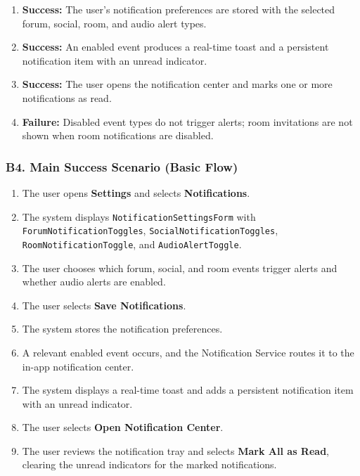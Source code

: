 \documentclass[12pt]{article}
\begin{document}
\begin{enumerate}
\item \textbf{Success:} The user's notification preferences are stored with the selected forum, social, room, and audio alert types.
\item \textbf{Success:} An enabled event produces a real-time toast and a persistent notification item with an unread indicator.
\item \textbf{Success:} The user opens the notification center and marks one or more notifications as read.
\item \textbf{Failure:} Disabled event types do not trigger alerts; room invitations are not shown when room notifications are disabled.
\end{enumerate}
\par\medskip

\hypertarget{sec:b4-main-success-scenario-basic-flow}{}
\subsubsection*{B4. Main Success Scenario (Basic Flow)}
\par\medskip

\begin{enumerate}
\item The user opens \textbf{Settings} and selects \textbf{Notifications}.
\item The system displays \texttt{NotificationSettingsForm} with \texttt{ForumNotificationToggles}, \texttt{SocialNotificationToggles}, \texttt{RoomNotificationToggle}, and \texttt{AudioAlertToggle}.
\item The user chooses which forum, social, and room events trigger alerts and whether audio alerts are enabled.
\item The user selects \textbf{Save Notifications}.
\item The system stores the notification preferences.
\item A relevant enabled event occurs, and the Notification Service routes it to the in-app notification center.
\item The system displays a real-time toast and adds a persistent notification item with an unread indicator.
\item The user selects \textbf{Open Notification Center}.
\item The user reviews the notification tray and selects \textbf{Mark All as Read}, clearing the unread indicators for the marked notifications.
\end{enumerate}
\par\medskip
\end{document}
